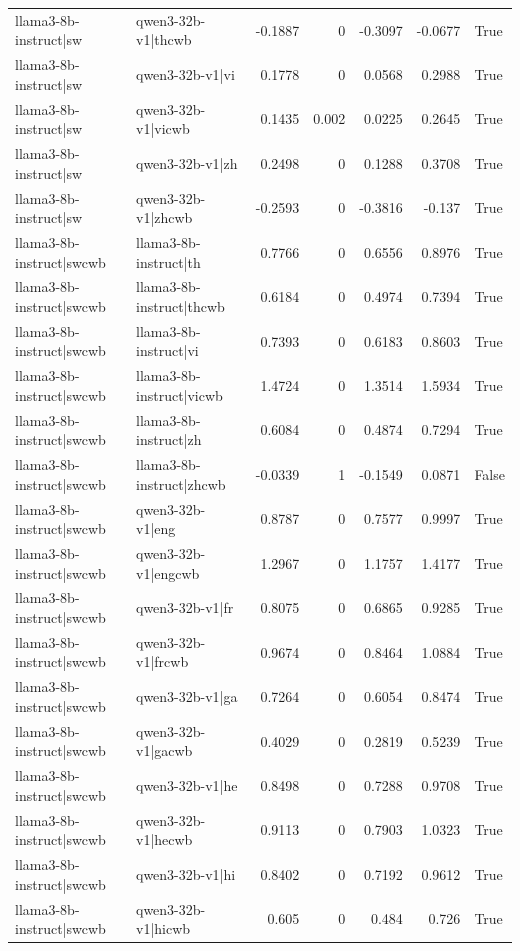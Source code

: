 \begin{table}
\begin{tabular}{l l r r r r l}
llama3-8b-instruct|sw & qwen3-32b-v1|thcwb & -0.1887 & 0 & -0.3097 & -0.0677 & True \\
llama3-8b-instruct|sw & qwen3-32b-v1|vi & 0.1778 & 0 & 0.0568 & 0.2988 & True \\
llama3-8b-instruct|sw & qwen3-32b-v1|vicwb & 0.1435 & 0.002 & 0.0225 & 0.2645 & True \\
llama3-8b-instruct|sw & qwen3-32b-v1|zh & 0.2498 & 0 & 0.1288 & 0.3708 & True \\
llama3-8b-instruct|sw & qwen3-32b-v1|zhcwb & -0.2593 & 0 & -0.3816 & -0.137 & True \\
llama3-8b-instruct|swcwb & llama3-8b-instruct|th & 0.7766 & 0 & 0.6556 & 0.8976 & True \\
llama3-8b-instruct|swcwb & llama3-8b-instruct|thcwb & 0.6184 & 0 & 0.4974 & 0.7394 & True \\
llama3-8b-instruct|swcwb & llama3-8b-instruct|vi & 0.7393 & 0 & 0.6183 & 0.8603 & True \\
llama3-8b-instruct|swcwb & llama3-8b-instruct|vicwb & 1.4724 & 0 & 1.3514 & 1.5934 & True \\
llama3-8b-instruct|swcwb & llama3-8b-instruct|zh & 0.6084 & 0 & 0.4874 & 0.7294 & True \\
llama3-8b-instruct|swcwb & llama3-8b-instruct|zhcwb & -0.0339 & 1 & -0.1549 & 0.0871 & False \\
llama3-8b-instruct|swcwb & qwen3-32b-v1|eng & 0.8787 & 0 & 0.7577 & 0.9997 & True \\
llama3-8b-instruct|swcwb & qwen3-32b-v1|engcwb & 1.2967 & 0 & 1.1757 & 1.4177 & True \\
llama3-8b-instruct|swcwb & qwen3-32b-v1|fr & 0.8075 & 0 & 0.6865 & 0.9285 & True \\
llama3-8b-instruct|swcwb & qwen3-32b-v1|frcwb & 0.9674 & 0 & 0.8464 & 1.0884 & True \\
llama3-8b-instruct|swcwb & qwen3-32b-v1|ga & 0.7264 & 0 & 0.6054 & 0.8474 & True \\
llama3-8b-instruct|swcwb & qwen3-32b-v1|gacwb & 0.4029 & 0 & 0.2819 & 0.5239 & True \\
llama3-8b-instruct|swcwb & qwen3-32b-v1|he & 0.8498 & 0 & 0.7288 & 0.9708 & True \\
llama3-8b-instruct|swcwb & qwen3-32b-v1|hecwb & 0.9113 & 0 & 0.7903 & 1.0323 & True \\
llama3-8b-instruct|swcwb & qwen3-32b-v1|hi & 0.8402 & 0 & 0.7192 & 0.9612 & True \\
llama3-8b-instruct|swcwb & qwen3-32b-v1|hicwb & 0.605 & 0 & 0.484 & 0.726 & True \\

\end{tabular}
\end{table}
